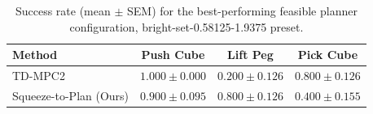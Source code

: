 \begin{table}[t]
\centering
\begin{tabular}{lccc}
\toprule
Method & Push Cube & Lift Peg & Pick Cube \\
\midrule
TD-MPC2 & $1.000 \pm 0.000$ & $0.200 \pm 0.126$ & $0.800 \pm 0.126$ \\
Squeeze-to-Plan (Ours) & $0.900 \pm 0.095$ & $0.800 \pm 0.126$ & $0.400 \pm 0.155$ \\
\bottomrule
\end{tabular}
\caption{Success rate (mean $\pm$ SEM) for the best-performing feasible planner configuration, bright-set-0.58125-1.9375 preset.}
\label{tab:latency_vs_success_rate_bright-set-0.58125-1.9375}
\end{table}
